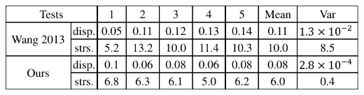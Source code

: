 \begin{table}[htb]
\caption{\label{tab:result-cmp-costeffective}
            Comparison of Wang et al.~ and our method. We apply various forces for each method, where
            force 1 is applied on the top, force 2 and 3 are on the front, and force 4 and 5 are on the side of the model.
            Our result is weaker in the first case. However, the average and the variation of our method is much smaller.}
\centering
\includegraphics[width=\linewidth]{Tables/table4}
\end{table}



